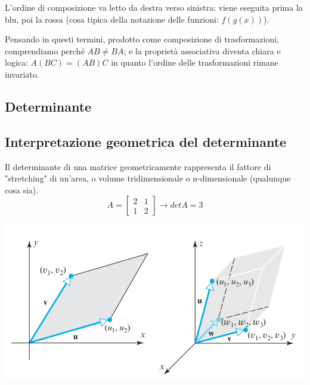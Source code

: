 \documentclass[x11names]{article}
\begin{document}
\noindent
L'ordine di composizione va letto da destra verso sinistra: viene eseguita prima la \textcolor{SteelBlue3}{blu}, poi la \textcolor{Brown2}{rossa} (cosa tipica della notazione delle funzioni: $f(g(x))$).

\noindent
Pensando in questi termini, prodotto come composizione di trasformazioni, comprendiamo perché $AB \neq BA$; e la proprietà associativa diventa chiara e logica: $A(BC) = (AB)C$ in quanto l'ordine delle trasformazioni rimane invariato.



\newpage
\subsection{Determinante}
\subsection*{Interpretazione geometrica del determinante}
Il determinante di una matrice geometricamente rappresenta il fattore di "stretching" di un'area, o volume tridimensionale o n-dimensionale (qualunque cosa sia).
$$
A = \begin{bmatrix}
    2 & 1 \\
    1 & 2
\end{bmatrix}
\rightarrow
detA = 3
$$

\begin{center}
\includegraphics[scale=0.3]{figures/determ.png}
\end{center}
\end{document}
